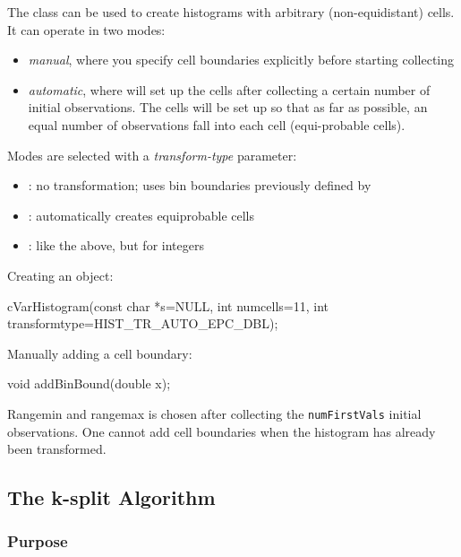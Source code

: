The  class can be used to create
histograms with arbitrary (non-equidistant) cells.
It can operate in two modes:

\begin{itemize}
  \item \textit{manual}, where you specify cell boundaries explicitly
     before starting collecting
  \item \textit{automatic}, where  will set up the cells
     after collecting a certain number of initial observations. The cells
     will be set up so that as far as possible, an equal number of observations
     fall into each cell (equi-probable cells).
\end{itemize}

Modes are selected with a \textit{transform-type} parameter:
\begin{itemize}
  \item{: no transformation; uses bin boundaries
    previously defined by }
  \item{: automatically creates equiprobable cells}
  \item{: like the above, but for integers}
\end{itemize}

Creating an object:

\begin{cpp}
cVarHistogram(const char *s=NULL,
              int numcells=11,
              int transformtype=HIST_TR_AUTO_EPC_DBL);
\end{cpp}

Manually adding a cell boundary:

\begin{cpp}
void addBinBound(double x);
\end{cpp}

Rangemin and rangemax is chosen after collecting the
\texttt{numFirstVals} initial observations. One cannot add cell
boundaries when the histogram has already been transformed.





\subsection{The k-split Algorithm}

\subsubsection{Purpose}


